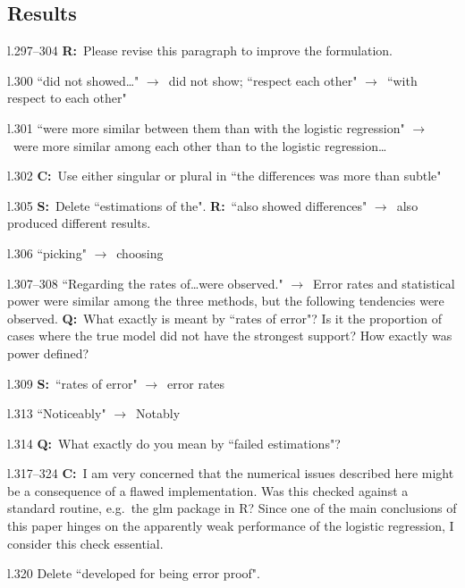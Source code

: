 \documentclass[11pt]{article}
\newenvironment{my_description}
{\begin{description}
  \setlength{\itemsep}{2pt}
  \setlength{\parskip}{0pt}
  \setlength{\parsep}{0pt}}
{\end{description}}
\newcommand{\ra}{$\rightarrow$\ }
\newcommand{\C}{\textbf{C:}\ }
\newcommand{\Q}{\textbf{Q:}\ }
\newcommand{\R}{\textbf{R:}\ }
\newcommand{\V}{\textbf{S:}\ }
\begin{document}
\subsection{Results}
\begin{my_description}
	\item[l.297--304] \R Please revise this paragraph to improve the formulation.
	\item[l.300] ``did not showed\dots" \ra did not show; ``respect each other" \ra ``with respect to each other"
	\item[l.301] ``were more similar between them than with the logistic regression" \ra were more similar among each other than to the logistic regression\dots
	\item[l.302] \C Use either singular or plural in ``the differences was more than subtle"
	\item[l.305] \V Delete ``estimations of the". \R ``also showed differences" \ra also produced different results.
	\item[l.306] ``picking" \ra choosing
	\item[l.307--308] ``Regarding the rates of\dots were observed." \ra Error rates and statistical power were similar among the three methods, but the following tendencies were observed. \Q What exactly is meant by ``rates of error"? Is it the proportion of cases where the true model did not have the strongest support? How exactly was power defined?
	\item[l.309] \V ``rates of error" \ra error rates
	\item[l.313] ``Noticeably" \ra Notably
	\item[l.314] \Q What exactly do you mean by ``failed estimations"?
	\item[l.317--324] \C I am very concerned that the numerical issues described here might be a consequence of a flawed implementation. Was this checked against a standard routine, e.g.\ the glm package in R? Since one of the main conclusions of this paper hinges on the apparently weak performance of the logistic regression, I consider this check essential.
	\item[l.320] Delete ``developed for being error proof".
\end{my_description}
\end{document}
